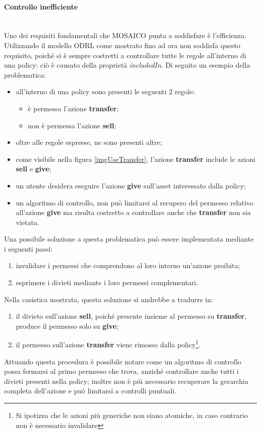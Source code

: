 \documentclass[12pt,a4paper,twoside]{book}
\begin{document}
\paragraph{Controllo inefficiente}\mbox{}\\
Uno dei requisiti fondamentali che MOSAICO punta a soddisfare è l'efficienza. Utilizzando il modello ODRL come mostrato fino ad ora non soddisfa questo requisito, poiché si è sempre costretti a controllare tutte le regole all'interno di una policy: ciò è causato della proprietà \textit{includedIn}. Di seguito un esempio della problematica:
\begin{itemize}
\item all'interno di una policy sono presenti le seguenti 2 regole:
\begin{itemize}
\item è permessa l'azione \textbf{transfer};
\item non è permessa l'azione \textbf{sell};
\end{itemize}
\item oltre alle regole espresse, ne sono presenti altre;
\item come visibile nella figura \ref{imgUseTransfer}, l'azione \textbf{transfer} include le azioni \textbf{sell} e \textbf{give}; 
\item un utente desidera eseguire l'azione \textbf{give} sull'asset interessato dalla policy;
\item un algoritmo di controllo, non può limitarsi al recupero del permesso relativo all'azione \textbf{give} ma risulta costretto a controllare anche che \textbf{transfer} non sia vietata.
\end{itemize}
Una possibile soluzione a questa problematica può essere implementata mediante i seguenti passi:
\begin{enumerate}
\item invalidare i permessi che comprendono al loro interno un'azione proibita;
\item esprimere i divieti mediante i loro permessi complementari.
\end{enumerate}
Nella casistica mostrata, questa soluzione si andrebbe a tradurre in:
\begin{enumerate}
\item il divieto sull'azione \textbf{sell}, poiché presente insieme al permesso su \textbf{transfer}, produce il permesso solo su \textbf{give};
\item il permesso sull'azione \textbf{transfer} viene rimosso dalla policy\footnote{Si ipotizza che le azioni più generiche non siano atomiche, in caso contrario non è necessario invalidare}.
\end{enumerate}
Attuando questa procedura è possibile notare come un algoritmo di controllo possa fermarsi al primo permesso che trova, anziché controllare anche tutti i divieti presenti nella policy; inoltre non è più necessario recuperare la gerarchia completa dell'azione e può limitarsi a controlli puntuali.
\end{document}
